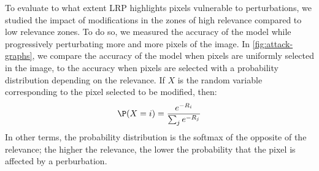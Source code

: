 \documentclass{../cs-classes/cs-classes}
\newcommand*{\1}{\digitsbb{1}}
\newcommand*{\0}{\digitsbb{0}}
\begin{document}
To evaluate to what extent LRP highlights pixels vulnerable to perturbations, we studied the impact of modifications in the zones of high relevance compared to low relevance zones. To do so, we measured the accuracy of the model while progressively perturbating more and more pixels of the image. In \autoref{fig:attack-graphs}, we compare the accuracy of the model when pixels are uniformly selected in the image, to the accuracy when pixels are selected with a probability distribution depending on the relevance. If $X$ is the random variable corresponding to the pixel selected to be modified, then:
\begin{equation}
    \P(X=i) = \frac{e^{-R_i}}{\sum_je^{-R_j}}
\end{equation}
In other terms, the probability distribution is the softmax of the opposite of the relevance; the higher the relevance, the lower the probability that the pixel is affected by a perburbation.
\end{document}
